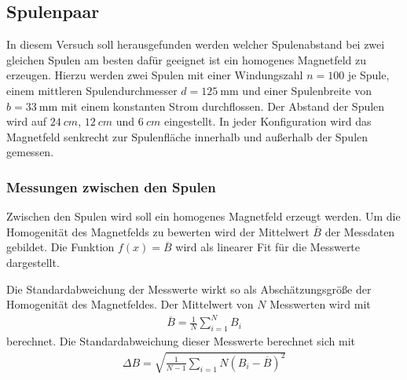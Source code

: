 \subsection{Spulenpaar}
In diesem Versuch soll herausgefunden werden welcher Spulenabstand bei zwei gleichen Spulen
am besten dafür geeignet ist ein homogenes Magnetfeld zu erzeugen.
Hierzu werden zwei Spulen mit einer Windungszahl $n= 100$ je Spule, einem mittleren Spulendurchmesser $d = \qty{125}{\mm}$
und einer Spulenbreite von $b = \qty[]{33}{\mm}$ mit einem konstanten Strom durchflossen.
Der Abstand der Spulen wird auf $\qty[]{24}{cm}$, $\qty[]{12}{cm}$ und $\qty[]{6}{cm}$ eingestellt.
In jeder Konfiguration wird das Magnetfeld senkrecht zur Spulenfläche innerhalb und außerhalb der Spulen gemessen.

\subsubsection{Messungen zwischen den Spulen}
Zwischen den Spulen wird soll ein homogenes Magnetfeld erzeugt werden.
Um die Homogenität des Magnetfelds zu bewerten wird der Mittelwert $\overline{B}$ der Messdaten gebildet.
Die Funktion $f(x) = \overline{B}$  wird als linearer Fit für die Messwerte dargestellt.





Die Standardabweichung der Messwerte wirkt so als Abschätzungsgröße der Homogenität des Magnetfeldes.
Der Mittelwert von $N$ Messwerten wird mit
\begin{align}
    \overline{B} = \frac{1}{N} \sum_{i=1}^{N} B_{i}
\end{align} 
berechnet.
Die Standardabweichung dieser Messwerte berechnet sich mit
\begin{align}
    \Delta B = \sqrt{\frac{1}{N-1} \sum_{i=1}{N}\left(B_{i}- \overline{B}\right)^2}
\end{align}

